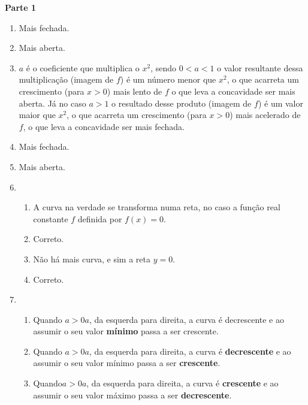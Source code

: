 \documentclass[10 pt,usenames,dvipsnames, oneside]{article}
\begin{document}
\ifdefined\prof
\clearpage
\begin{solucao}

\textbf{Parte 1}
\begin{enumerate}
\item {} 
Mais fechada.

\item {} 
Mais aberta.

\item {} 
\(a\) é o coeficiente que multiplica o \(x^2\), sendo \(0<a<1\) o valor resultante dessa multiplicação (imagem de \(f\)) é um número menor que \(x^2\), o que acarreta um crescimento (para \(x>0\)) mais lento de \(f\) o que leva a concavidade ser mais aberta. Já no caso \(a>1\) o resultado desse produto (imagem de \(f\)) é um valor maior que \(x^2\), o que acarreta um crescimento (para \(x>0\)) mais acelerado de \(f\), o que leva a concavidade ser mais fechada.

\item {} 
Mais fechada.

\item {} 
Mais aberta.

\item {} 
\begin{enumerate}
\item A curva na verdade se transforma numa reta, no caso a função real constante \(f\) definida por \(f(x)=0\).

\item Correto.

\item Não há mais curva, e sim a reta \(y=0\).

\item Correto.
\end{enumerate}

\item {} 
\begin{enumerate}
\item Quando $a>0a$, da esquerda para direita, a curva é decrescente e ao assumir o seu valor \textbf{mínimo} passa a ser crescente.

\item Quando $a>0a$, da esquerda para direita, a curva é \textbf{decrescente} e ao assumir o seu valor mínimo passa a ser \textbf{crescente}.

\item Quando$a>0a$, da esquerda para direita, a curva é \textbf{crescente} e ao assumir o seu valor máximo passa a ser \textbf{decrescente}.


\end{enumerate}
\end{enumerate}
\end{solucao}
\end{document}
